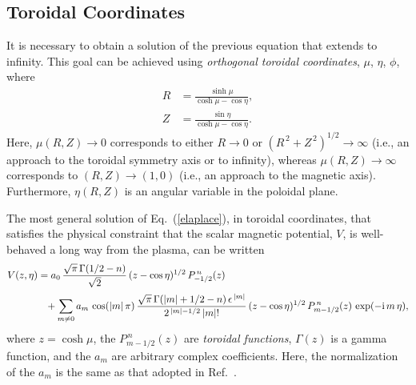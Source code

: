 \documentclass[12pt,prb,aps]{revtex4-1}
\begin{document}
\subsection{Toroidal Coordinates}
It is necessary to obtain a solution of the previous equation that extends to infinity. This goal can be achieved using {\em orthogonal toroidal coordinates}, $\mu$, $\eta$, $\phi$, 
where\,\cite{morse}
\begin{align}\label{e54cx}
R &= \frac{\sinh\mu}{\cosh\mu-\cos\eta},\\[0.5ex]
Z&= \frac{\sin\eta}{\cosh\mu-\cos\eta}.\label{e55cc}
\end{align}
Here, $\mu(R,Z)\rightarrow 0$ corresponds to either $R\rightarrow 0$ or $(R^{\,2}+Z^{\,2})^{1/2}\rightarrow\infty$ (i.e.,
an approach to the toroidal symmetry axis or to infinity), whereas $\mu(R,Z)\rightarrow \infty$
corresponds to $(R, Z) \rightarrow (1, 0)$ (i.e., an approach to the magnetic axis). Furthermore, $\eta(R,Z)$ is an angular variable in the poloidal
plane. 

 The most general solution of Eq.~(\ref{elaplace}), in toroidal coordinates, that satisfies the physical constraint that the scalar magnetic
 potential, $V$,    is well-behaved a long way from the plasma, can be written\,\cite{morse1}
\begin{align}\label{e233}
V(z,\eta) &=
 a_0\,\frac{\sqrt{\pi}\,\Gamma(1/2-n)}{\sqrt{2}}\,(z-\cos\eta)^{1/2}\,P_{-1/2}^{\,n}(z) \\[0.5ex]
&\phantom{=}+\sum_{m\neq 0} a_m\,\cos(|m|\,\pi)\,
\frac{\sqrt{\pi}\,\Gamma(|m|+1/2-n)\,\epsilon^{\,|m|}}{2^{\,|m|-1/2}\,|m|!}
\,(z-\cos\eta)^{1/2}\,P_{m-1/2}^{\,n}(z) \,\exp(-{\rm i}\,m\,\eta),\nonumber
\end{align}
where $z=\cosh\mu$, the $P_{m-1/2}^{\,n}(z)$ are {\em toroidal functions},\cite{abrama}  $\Gamma(z)$ is a
gamma function,\cite{abramb} and the $a_m$ are arbitrary complex coefficients.
Here, the normalization of the $a_m$ is the same as that adopted in Ref.~.
\end{document}
